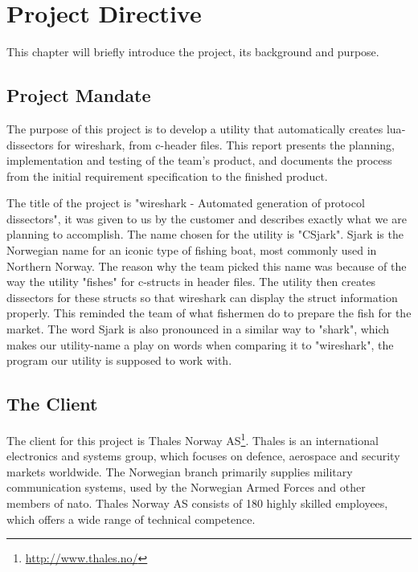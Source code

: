 \chapter{Project Directive}
This chapter will briefly introduce the project, its background and purpose.


\section{Project Mandate}
The purpose of this project is to develop a \gls{utility} that automatically creates \Gls{lua}-\glspl{dissector} for \Gls{wireshark}, from \Gls{c}-\gls{header} files. This report presents the planning, implementation
 and testing of the team’s product, and documents the process from the initial requirement specification to the finished product. 

The title of the project is "\Gls{wireshark} - Automated generation of \gls{protocol} \glspl{dissector}", it was given to us by the customer and describes exactly what we are planning to accomplish.\cite{Compendium} The name chosen for the \gls{utility} is "CSjark". Sjark is the Norwegian name for an iconic type of fishing boat, most commonly used in Northern Norway. The reason why the team picked this name was because of the way the \gls{utility} "fishes" for \Gls{c}-\glspl{struct} in \gls{header} files. The \gls{utility} then creates \glspl{dissector} for these \glspl{struct} so that \Gls{wireshark} can display the \gls{struct} information properly. This reminded the team of what fishermen do to prepare the fish for the market. The word Sjark is also pronounced in a similar way to "shark", which makes our \gls{utility}-name a play on words when comparing it to "\Gls{wireshark}", the program our \gls{utility} is supposed to work with.


\section{The Client}
The client for this project is
Thales Norway AS\footnote{\url{http://www.thales.no/}}. Thales is an
international electronics and systems group, which focuses on defence,
aerospace and security markets worldwide. The Norwegian branch primarily
supplies military communication systems, used by the Norwegian Armed Forces
and other members of \Gls{nato}. Thales Norway AS consists of 180 highly skilled
employees, which offers a wide range of technical competence.\cite{ThalesNO}
	
